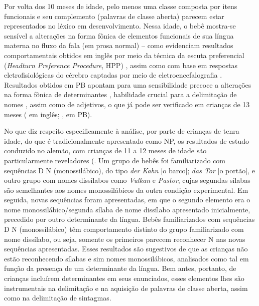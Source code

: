 \documentclass[output=paper]{LSP/langsci}
\begin{document}
Por volta dos 10 meses de idade, pelo menos uma classe composta por itens funcionais e seu complemento (palavras de classe aberta) parecem estar representados no léxico em desenvolvimento. Nessa idade, o bebê mostra-se sensível a alterações na forma fônica de elementos funcionais de sua língua materna no fluxo da fala (em prosa normal) -- como evidenciam resultados comportamentais obtidos em inglês por meio da técnica da escuta preferencial (\textit{Headturn Preference Procedure}, HPP) \citep{shady1996}, assim como com base em respostas eletrofisiológicas do cérebro captadas por meio de eletroencefalografia \citep{shafer_etal1998}. Resultados obtidos em PB apontam para uma sensibilidade precoce a alterações na forma fônica de determinantes \citep{name2002,namecorrea2003}, habilidade crucial para a delimitação de nomes \citep{name2008}, assim como de adjetivos, o que já pode ser verificado em crianças de 13 meses (\citealt{waxman2006} em inglês; \citealt{teixeiracorrea2008}, em PB). 

No que diz respeito especificamente à análise, por parte de crianças de tenra idade, do que é tradicionalmente apresentado como NP, os resultados de estudo conduzido no alemão, com crianças de 11 a 12 meses de idade são particularmente reveladores (\citep{hohleweissenborn2000,hohle_etal2002}. Um grupo de bebês foi familiarizado com sequências D N (monossilábico), do tipo \textit{der Kahn} [o barco]; \textit{das Tor} [o portão], e outro grupo com nomes dissílabos como \textit{Vulkan} e \textit{Pastor}, cujas segundas sílabas são semelhantes aos nomes monossilábicos da outra condição experimental. Em seguida, novas sequências foram apresentadas, em que o segundo elemento era o nome monossilábico/segunda sílaba de nome dissílabo apresentado inicialmente, precedido por outro determinante da língua. Bebês familiarizados com sequências D N (monossilábico) têm comportamento distinto do grupo familiarizado com nome dissílabo, ou seja, somente os primeiros parecem reconhecer N nas novas sequências apresentadas. Esses resultados são sugestivos de que as crianças não estão reconhecendo sílabas e sim nomes monossilábicos, analisados como tal em função da presença de um determinante da língua. Bem antes, portanto, de crianças incluírem determinantes em seus enunciados, esses elementos lhes são instrumentais na delimitação e na aquisição de palavras de classe aberta, assim como na delimitação de sintagmas.
\end{document}
